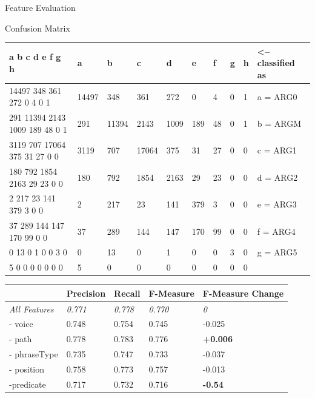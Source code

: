 \documentclass[10pt]{beamer}
\begin{document}
\begin{frame}{Feature Evaluation}

\begin{frame}{Confusion Matrix}

\begin{table}[h]
\begin{tabular}{l|llllllll|l}
a     b     c     d     e     f     g     h     & a     & b     & c     & d    & e   & f  & g & h & \textless-- classified as \\ \hline
14497   348   361   272     0     4     0     1 & 14497 & 348   & 361   & 272  & 0   & 4  & 0 & 1 & a = ARG0                  \\
291 11394  2143  1009   189    48     0     1   & 291   & 11394 & 2143  & 1009 & 189 & 48 & 0 & 1 & b = ARGM                  \\
3119   707 17064   375    31    27     0     0  & 3119  & 707   & 17064 & 375  & 31  & 27 & 0 & 0 & c = ARG1                  \\
180   792  1854  2163    29    23     0     0   & 180   & 792   & 1854  & 2163 & 29  & 23 & 0 & 0 & d = ARG2                  \\
2   217    23   141   379     3     0     0     & 2     & 217   & 23    & 141  & 379 & 3  & 0 & 0 & e = ARG3                  \\
37   289   144   147   170    99     0     0    & 37    & 289   & 144   & 147  & 170 & 99 & 0 & 0 & f = ARG4                  \\
0    13     0     1     0     0     3     0     & 0     & 13    & 0     & 1    & 0   & 0  & 3 & 0 & g = ARG5                  \\
5     0     0     0     0     0     0     0     & 5     & 0     & 0     & 0    & 0   & 0  & 0 & 0 &                          
\end{tabular}
\end{table}

\end{frame}

\begin{table}[h]
\begin{tabular}{l|lll|l}
                      & Precision      & Recall         & F-Measure      & F-Measure Change \\ \hline
\textit{All Features} & \textit{0.771} & \textit{0.778} & \textit{0.770} & \textit{0}       \\ \hline
- voice               & 0.748          & 0.754          & 0.745          & -0.025           \\
- path                & 0.778          & 0.783          & 0.776          & \textbf{+0.006}  \\
- phraseType          & 0.735          & 0.747          & 0.733          & -0.037           \\
- position            & 0.758          & 0.773          & 0.757          & -0.013           \\
-predicate            & 0.717          & 0.732          & 0.716          & \textbf{-0.54}  
\end{tabular}
\end{table}

\end{frame}
\end{document}
